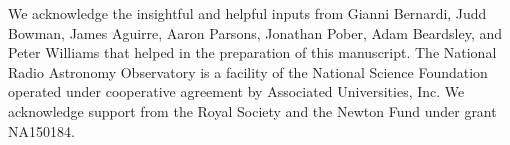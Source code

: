 \documentclass[
reprint,
superscriptaddress,
amsmath,
amssymb,
aps,
prd
]{revtex4-1}
\begin{document}
\begin{acknowledgments}
We acknowledge the insightful and helpful inputs from Gianni Bernardi, Judd Bowman, James Aguirre, Aaron Parsons, Jonathan Pober, Adam Beardsley, and Peter Williams that helped in the preparation of this manuscript. The National Radio Astronomy Observatory is a facility of the National Science Foundation operated under cooperative agreement by Associated Universities, Inc. We acknowledge support from the Royal Society and the Newton Fund under grant NA150184.
\end{acknowledgments}





\end{document}
